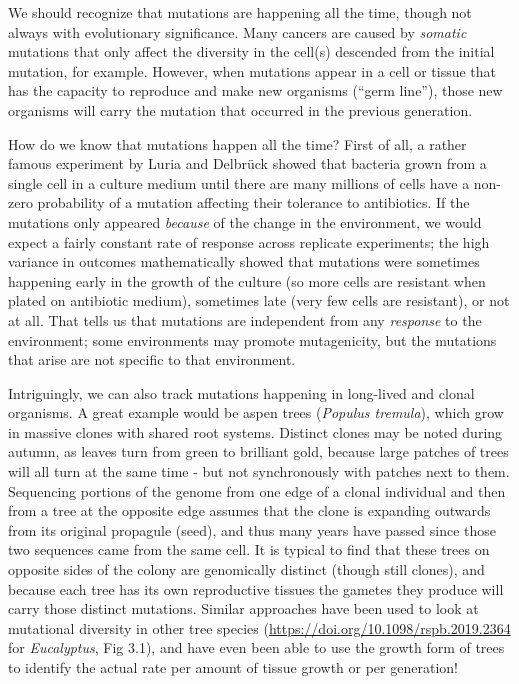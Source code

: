 \documentclass[
]{article}
\begin{document}
We should recognize that mutations are happening all the time, though
not always with evolutionary significance. Many cancers are caused by
\emph{somatic} mutations that only affect the diversity in the cell(s)
descended from the initial mutation, for example. However, when
mutations appear in a cell or tissue that has the capacity to reproduce
and make new organisms (``germ line''), those new organisms will carry
the mutation that occurred in the previous generation.

How do we know that mutations happen all the time? First of all, a
rather famous experiment by Luria and Delbrück showed that bacteria
grown from a single cell in a culture medium until there are many
millions of cells have a non-zero probability of a mutation affecting
their tolerance to antibiotics. If the mutations only appeared
\emph{because} of the change in the environment, we would expect a
fairly constant rate of response across replicate experiments; the high
variance in outcomes mathematically showed that mutations were sometimes
happening early in the growth of the culture (so more cells are
resistant when plated on antibiotic medium), sometimes late (very few
cells are resistant), or not at all. That tells us that mutations are
independent from any \emph{response} to the environment; some
environments may promote mutagenicity, but the mutations that arise are
not specific to that environment.

Intriguingly, we can also track mutations happening in long-lived and
clonal organisms. A great example would be aspen trees (\emph{Populus
tremula}), which grow in massive clones with shared root systems.
Distinct clones may be noted during autumn, as leaves turn from green to
brilliant gold, because large patches of trees will all turn at the same
time - but not synchronously with patches next to them. Sequencing
portions of the genome from one edge of a clonal individual and then
from a tree at the opposite edge assumes that the clone is expanding
outwards from its original propagule (seed), and thus many years have
passed since those two sequences came from the same cell. It is typical
to find that these trees on opposite sides of the colony are genomically
distinct (though still clones), and because each tree has its own
reproductive tissues the gametes they produce will carry those distinct
mutations. Similar approaches have been used to look at mutational
diversity in other tree species
(\url{https://doi.org/10.1098/rspb.2019.2364} for \emph{Eucalyptus}, Fig
3.1), and have even been able to use the growth form of trees to
identify the actual rate per amount of tissue growth or per generation!
\end{document}
